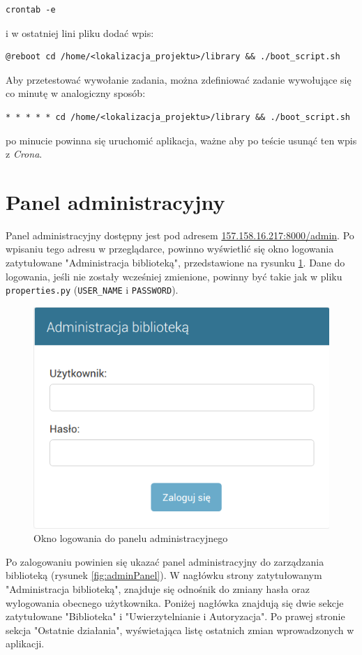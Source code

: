 \documentclass[twoside]{projektInzynierskiMS}
\begin{document}
\begin{verbatim}
crontab -e
\end{verbatim}

i w ostatniej lini pliku dodać wpis:

\begin{verbatim}
@reboot cd /home/<lokalizacja_projektu>/library && ./boot_script.sh
\end{verbatim}

Aby przetestować wywołanie zadania, można zdefiniować zadanie wywołujące się co minutę w analogiczny sposób:

\begin{verbatim}
* * * * * cd /home/<lokalizacja_projektu>/library && ./boot_script.sh
\end{verbatim}

po minucie powinna się uruchomić aplikacja, ważne aby po teście usunąć ten wpis z \textit{Crona}. 


\section{Panel administracyjny}

Panel administracyjny dostępny jest pod adresem \href{http://157.158.16.217:8000/admin}{157.158.16.217:8000/admin}. Po wpisaniu tego adresu w przeglądarce, powinno wyświetlić się okno logowania zatytułowane "Administracja biblioteką", przedstawione na rysunku \ref{fig:adminLogin}. Dane do logowania, jeśli nie zostały wcześniej zmienione, powinny być takie jak w pliku \verb`properties.py` (\verb`USER_NAME` i \verb`PASSWORD`). 

\begin{figure}[h]
  \centering
  \includegraphics[width=0.4\linewidth]{img/oknLogowania.png}
  \caption{Okno logowania do panelu administracyjnego}
  \label{fig:adminLogin}
\end{figure}

Po zalogowaniu powinien się ukazać panel administracyjny do zarządzania biblioteką (rysunek \ref{fig:adminPanel}). W nagłówku strony zatytułowanym "Administracja biblioteką", znajduje się odnośnik do zmiany hasła oraz wylogowania obecnego użytkownika. Poniżej nagłówka znajdują się dwie sekcje zatytułowane "Biblioteka" i "Uwierzytelnianie i Autoryzacja". Po prawej stronie sekcja "Ostatnie działania", wyświetająca listę ostatnich zmian wprowadzonych w aplikacji.
\end{document}
